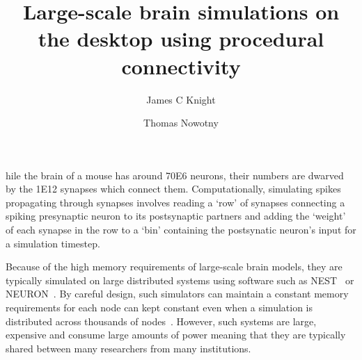 \documentclass[9pt,twocolumn,twoside,lineno]{pnas-new}
\title{Large-scale brain simulations on the desktop using procedural connectivity}
\author[a,1]{James C Knight}
\author[a]{Thomas Nowotny}
\affil[a]{Centre for Computational Neuroscience and Robotics, School of Engineering and Informatics, University of Sussex, Brighton, United Kingdom}
\newcommand{\todo}[1]{\textbf{\textsc{\textcolor{red}{(TODO: #1)}}}}
\begin{document}
\maketitle
\thispagestyle{firststyle}

hile the brain of a mouse has around \num{70E6} neurons, their numbers are dwarved by the \num{1E12} synapses which connect them.
Computationally, simulating spikes propagating through synapses involves reading a `row' of synapses connecting a spiking presynaptic neuron to its postsynaptic partners and adding the `weight' of each synapse in the row to a `bin' containing the postsynatic neuron's input for a simulation timestep.

Because of the high memory requirements of large-scale brain models, they are typically simulated on large distributed systems using software such as NEST~\citep{Gewaltig2007} or NEURON~\citep{carnevale2006neuron}.
By careful design, such simulators can maintain a constant memory requirements for each node can kept constant even when a simulation is distributed across thousands of nodes~\citep{Jordan2018}.
However, such systems are large, expensive and consume large amounts of power meaning that they are typically shared between many researchers from many institutions.
\end{document}
